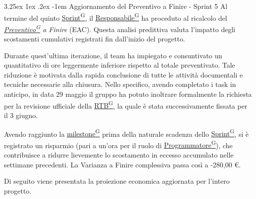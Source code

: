 \documentclass[a4paper,12pt]{article}
\makeatletter
\renewcommand\paragraph{\@startsection{paragraph}{5}{\z@}%
  {3.25ex \@plus1ex \@minus.2ex}%
  {-1em}%
  {\normalfont\normalsize\bfseries}}
\providecommand{\glslink}[2]{\href{https://alittlebyte-19.github.io/Documentazione/glossario.html\#gls-#1}{\underline{#2}\textsuperscript{\scriptsize G}}}
\makeatother
\begin{document}
\paragraph{Aggiornamento del Preventivo a Finire - Sprint 5}
Al termine del quinto \glslink{sprint}{Sprint}, il \glslink{responsabile}{Responsabile} ha proceduto al ricalcolo del \textit{\glslink{preventivo}{Preventivo} a Finire} (EAC). Questa analisi predittiva valuta l'impatto degli scostamenti cumulativi registrati fin dall'inizio del progetto.

Durante quest'ultima iterazione, il team ha impiegato e consuntivato un quantitativo di ore leggermente inferiore rispetto al totale preventivato. Tale riduzione è motivata dalla rapida conclusione di tutte le attività documentali e tecniche necessarie alla chiusura. Nello specifico, avendo completato i task in anticipo, in data 29 maggio il gruppo ha potuto inoltrare formalmente la richiesta per la revisione ufficiale della \glslink{rtb-requirements-and-technology-baseline}{RTB}, la quale è stata successivamente fissata per il 3 giugno.

Avendo raggiunto la \glslink{milestone}{milestone} prima della naturale scadenza dello \glslink{sprint}{Sprint}, si è registrato un risparmio (pari a un'ora per il ruolo di \glslink{programmatore}{Programmatore}), che contribuisce a ridurre lievemente lo scostamento in eccesso accumulato nelle settimane precedenti. La Varianza a Finire complessiva passa così a -280,00 \euro.

Di seguito viene presentata la proiezione economica aggiornata per l'intero progetto.
\end{document}
